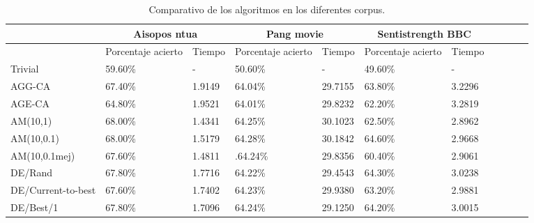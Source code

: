 \documentclass{article}
\begin{document}
\begin{table}[H]
	\begin{center}
		\scalebox{0.9} {
			\begin{tabular}{|l|l|l|l|l|l|l|l|l|l|l|}
				\hline
				& \multicolumn{2}{|c|}{Aisopos ntua} & \multicolumn{2}{|c|}{Pang movie} & \multicolumn{2}{|c|}{Sentistrength BBC}\\ \hline
				& Porcentaje acierto &Tiempo & Porcentaje acierto & Tiempo & Porcentaje acierto & Tiempo\\ \hline
				Trivial& 59.60\%& - & 50.60\% &  -& 49.60\% & -\\ \hline
				AGG-CA& 67.40\%& 1.9149 &64.04\%& 29.7155 & 63.80\%& 3.2296\\ \hline
				AGE-CA& 64.80\%& 1.9521 & 64.01\% & 29.8232 & 62.20\% &3.2819\\ \hline
				AM(10,1)& 68.00\%& 1.4341 &  64.25\% & 30.1023 & 62.50\%& 2.8962\\ \hline
				AM(10,0.1)& 68.00\%& 1.5179 &64.28\% & 30.1842 & 64.60\%& 2.9668\\ \hline
				AM(10,0.1mej)& 67.60\%& 1.4811 &.64.24\% & 29.8356  & 60.40\%& 2.9061\\ \hline
				DE/Rand& 67.80\%& 1.7716 & 64.22\% & 29.4543  & 64.30\%&3.0238\\ \hline
				DE/Current-to-best& 67.60\%&  1.7402 & 64.23\% & 29.9380 & 63.20\%& 2.9881\\ \hline
				DE/Best/1& 67.80\%& 1.7096 &  64.24\%& 29.1250& 64.20\%& 3.0015\\ \hline
			\end{tabular}
		}\caption{Comparativo de los algoritmos en los diferentes corpus.}
		\label{tabla:corpus1}
	\end{center}
\end{table}
\end{document}
